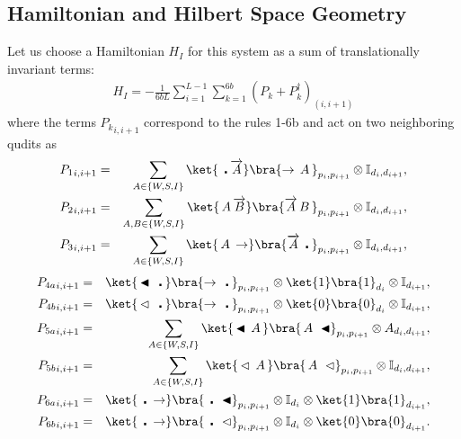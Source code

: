 \documentclass[11pt,letterpaper]{article}
\newcommand{\ii}{\mathbb{I}}											%
\newcommand{\<}{\langle}
\renewcommand{\>}{\rangle}
\newcommand{\gat}{\,\blacktriangleleft}  %
\newcommand{\mov}{\,\vartriangleleft}    %
\newcommand{\bul}{\:\:\centerdot\:}       %
\newcommand{\aga}{\,A\,}					%
\newcommand{\bga}{\,B\,}					%
\newcommand{\rb}{\overrightarrow{B}}
\begin{document}
\subsection{Hamiltonian and Hilbert Space Geometry}\label{hamgeo}

Let us choose a Hamiltonian $H_I$ for this system as a sum of translationally invariant terms:
\begin{eqnarray}
	H_I = - \frac{1}{6bL}\sum_{i=1}^{L-1} 
		\sum_{k=1}^{6b} \left( P_{k} + P_{k}^{\dagger} \right)_{(i,i+1)}
		\label{ourHi}
\end{eqnarray}
where the terms ${P_k}_{i,i+1}$ correspond to the rules 1-6b and act on two neighboring qudits as 
\begin{eqnarray}
	{P_1}_{i,i+1} &=& 
		\sum_{A\in\{W,S,I\}}			
			\ket{\bul\overrightarrow{A}}\bra{\rightarrow\aga}_{p_i,p_{i+1}}
		 \otimes 
		\ii_{d_i,d_{i+1}}	
			, \\
	{P_2}_{i,i+1} &=& 
		 \sum_{A,B\in\{W,S,I\}} 
		\ket{\aga\rb}\bra{\overrightarrow{A}\bga}_{p_i,p_{i+1}}
		\otimes
		\ii_{d_i,d_{i+1}} 
		,	 \\
	{P_3}_{i,i+1} &=& 
		 \sum_{A\in\{W,S,I\}}
			\ket{\aga\rightarrow}\bra{\overrightarrow{A}\bul}_{p_i,p_{i+1}}
		\otimes	\ii_{d_i,d_{i+1}}, 
\end{eqnarray}
\begin{eqnarray}
	{P_{4a}}_{i,i+1} &=& 
			\ket{\gat\bul}\bra{\rightarrow\bul}_{p_i,p_{i+1}}
		  \otimes 
			\ket{1}\bra{1}_{d_i}
		  \otimes 
			\ii_{d_{i+1}}, \\
	{P_{4b}}_{i,i+1} &=& 
		\ket{\mov\bul}\bra{\rightarrow\bul}_{p_i,p_{i+1}}
			\otimes
			\ket{0}\bra{0}_{d_i}\otimes \ii_{d_{i+1}}, \\
	{P_{5a}}_{i,i+1} &=& 
		\sum_{A\in\{W,S,I\}}  
			\ket{\gat\aga}\bra{\aga\gat}_{p_i,p_{i+1}}
			\otimes
			A_{d_i,d_{i+1}}, \\
	{P_{5b}}_{i,i+1} &=& 
		\sum_{A\in\{W,S,I\}} \ket{\mov\aga}\bra{\aga\mov}_{p_i,p_{i+1}}
			\otimes
			\ii_{d_i,d_{i+1}}, \\
	{P_{6a}}_{i,i+1} &=& 
		\ket{\bul\rightarrow}\bra{\bul\gat}_{p_i,p_{i+1}}
			\otimes
			\ii_{d_i} \otimes \ket{1}\bra{1}_{d_{i+1}}, \\
	{P_{6b}}_{i,i+1} &=& 
			\ket{\bul\rightarrow}\bra{\bul\mov}_{p_i,p_{i+1}}
			\otimes
			\ii_{d_i} \otimes \ket{0}\bra{0}_{d_{i+1}}.
\end{eqnarray}
\end{document}
